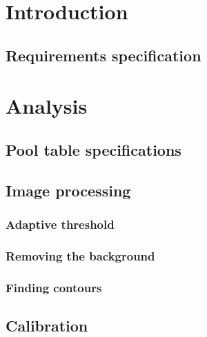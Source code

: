 
\usepackage{float}
\usepackage{graphicx}







\tableofcontents

\chapter{Introduction}
	\section{Requirements specification}
		

\chapter{Analysis}
	\section{Pool table specifications}
		\label{sec:rules}
		

\section{Image processing}
		

	\subsection{Adaptive threshold}
		\label{sec:adaptivethreshold}
		

	\subsection{Removing the background}
		\label{sec:removeback}
		

	\subsection{Finding contours}
		\label{sec:contours}
		

\section{Calibration}
